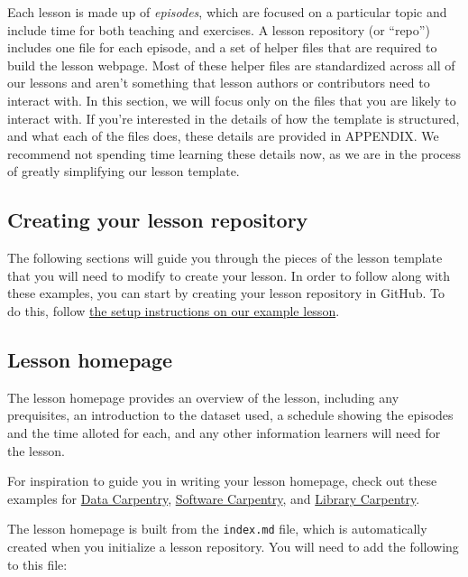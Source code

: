 \documentclass[
]{book}
\begin{document}
Each lesson is made up of \emph{episodes}, which are focused on a
particular topic and
include time for both teaching and exercises. A lesson repository
(or ``repo'') includes one file for each episode,
and a set of helper files that are required to build
the lesson webpage. Most of these helper files are standardized
across all of our lessons and aren't something that lesson
authors or contributors need to interact with. In this section,
we will focus only on the files that you are likely to
interact with. If you're interested in the details
of how the template is structured, and what each of the files
does, these details are provided in APPENDIX. We recommend not
spending time learning these details now, as we are in the
process of greatly simplifying our lesson template.

\hypertarget{creating-your-lesson-repository}{%
\subsection{Creating your lesson repository}\label{creating-your-lesson-repository}}

The following sections will guide you through the pieces of
the lesson template that you will need to modify to create your lesson.
In order to follow along with these examples, you can start by creating your
lesson repository in GitHub. To do this, follow \href{http://carpentries.github.io/lesson-example/setup.html}{the setup instructions
on our example lesson}.

\hypertarget{lesson-homepage}{%
\subsection{Lesson homepage}\label{lesson-homepage}}

The lesson homepage provides an overview of the lesson, including
any prequisites, an introduction to the
dataset used, a schedule showing
the episodes and the time alloted for each, and any other
information learners will need for the lesson.

For inspiration to guide you in writing your lesson homepage,
check out these examples for \href{https://datacarpentry.org/python-ecology-lesson/}{Data Carpentry}, \href{http://swcarpentry.github.io/git-novice/}{Software Carpentry}, and \href{https://librarycarpentry.org/lc-open-refine/}{Library Carpentry}.

The lesson homepage is built from the \texttt{index.md} file, which is
automatically created when you initialize a lesson repository. You
will need to add the following to this file:
\end{document}
